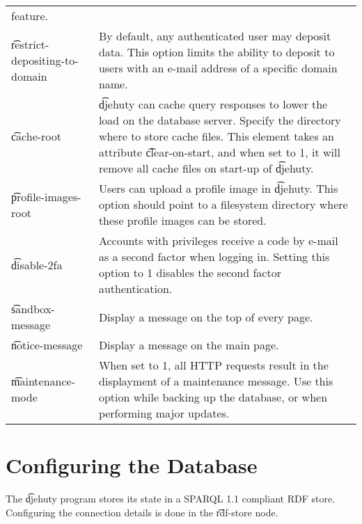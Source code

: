 \begin{tabular}{p{} p{}}
                               feature.\\
  \t{restrict-depositing-to-domain} & By default, any authenticated user may
                               deposit data.  This option limits the ability
                               to deposit to users with an e-mail address of
                               a specific domain name.\\
  \t{cache-root}             & \t{djehuty} can cache query responses to lower
                               the load on the database server.  Specify the
                               directory where to store cache files.  This
                               element takes an attribute \t{clear-on-start},
                               and when set to 1, it will remove all cache files
                               on start-up of \t{djehuty}.\\
  \t{profile-images-root}    & Users can upload a profile image in \t{djehuty}.
                               This option should point to a filesystem directory
                               where these profile images can be stored.\\
  \t{disable-2fa}            & Accounts with privileges receive a code by e-mail
                               as a second factor when logging in.  Setting this
                               option to 1 disables the second factor
                               authentication.\\
  \t{sandbox-message}        & Display a message on the top of every page.\\
  \t{notice-message}         & Display a message on the main page.\\
  \t{maintenance-mode}       & When set to 1, all HTTP requests result in the
                               displayment of a maintenance message. Use this
                               option while backing up the database, or when
                               performing major updates.\\
\end{tabular}

\section{Configuring the Database}

  The \t{djehuty} program stores its state in a SPARQL 1.1 compliant
  RDF store.  Configuring the connection details is done in the
  \t{rdf-store} node.


